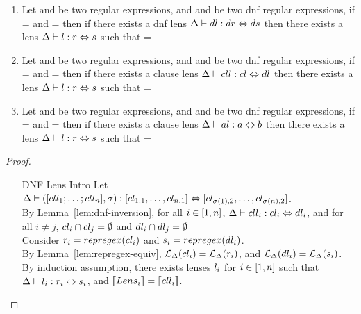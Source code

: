 \begin{lemma}\leavevmode
\begin{enumerate}
\item Let \Regex{} and \RegexAlt{} be two regular expressions, and \DNFRegex{}
and \DNFRegexAlt{} be two dnf regular expressions, if
\LanguageOf{\Delta{}}{\Regex{}} = \LanguageOf{\Delta{}}{\DNFRegex{}} and
\LanguageOf{\Delta{}}{\RegexAlt{}} = \LanguageOf{\Delta{}}{\DNFRegexAlt{}}
then if there exists a dnf lens
$\Delta \vdash dl : dr \Leftrightarrow ds$
then there exists a lens
$\Delta \vdash l : r \Leftrightarrow s$
such that \denot{\DNFLens} = \denot{\Lens}

\item Let \Regex{} and \RegexAlt{} be two regular expressions, and \Clause{}
and \ClauseAlt{} be two dnf regular expressions, if
\LanguageOf{\Delta{}}{\Regex{}} = \LanguageOf{\Delta{}}{\Clause{}} and
\LanguageOf{\Delta{}}{\RegexAlt{}} = \LanguageOf{\Delta{}}{\ClauseAlt{}}
then if there exists a clause lens
$\Delta \vdash cll : cl \Leftrightarrow dl$
then there exists a lens
$\Delta \vdash l : r \Leftrightarrow s$
such that \denot{\ClauseLens} = \denot{\Lens}

\item Let \Regex{} and \RegexAlt{} be two regular expressions, and \Atom{}
and \AtomAlt{} be two dnf regular expressions, if
\LanguageOf{\Delta{}}{\Regex{}} = \LanguageOf{\Delta{}}{\Atom{}} and
\LanguageOf{\Delta{}}{\RegexAlt{}} = \LanguageOf{\Delta{}}{\AtomAlt{}}
then if there exists a clause lens
$\Delta \vdash al : a \Leftrightarrow b$
then there exists a lens
$\Delta \vdash l : r \Leftrightarrow s$
such that \denot{\AtomLens} = \denot{\Lens}
\end{enumerate}
\begin{proof}
\begin{enumerate}
\item[DNF Lens Intro] Let $\Delta \vdash ([cll_1 ; \ldots ; cll_n],\sigma) : [cl_{1,1}, \ldots, cl_{n,1}] \Leftrightarrow [cl_{\sigma(1),2}, \ldots, cl_{\sigma(n),2}]$.\\
By Lemma~\ref{lem:dnf-inversion}, for all $i\in[1,n]$,
$\Delta \vdash cll_i : cl_i \Leftrightarrow dl_i$, and for all $i \neq j$, $cl_i \cap cl_j = \emptyset$ and $dl_i \cap dl_j = \emptyset$\\
Consider $r_i = repregex(cl_i)$ and $s_i = repregex(dl_i)$.\\
By Lemma~\ref{lem:repregex-equiv}, $\mathcal{L}_{\Delta}(cl_i) = \mathcal{L}_{\Delta}(r_i)$, and $\mathcal{L}_{\Delta}(dl_i) = \mathcal{L}_{\Delta}(s_i)$.\\
By induction assumption, there exists lenses $l_i$ for $i \in [1,n]$ such that $\Delta \vdash l_i : r_i \Leftrightarrow s_i$, and $[ \! [Lens_i] \! ]=[ \! [cll_i] \! ]$.


\end{enumerate}
\end{proof}
\end{lemma}
